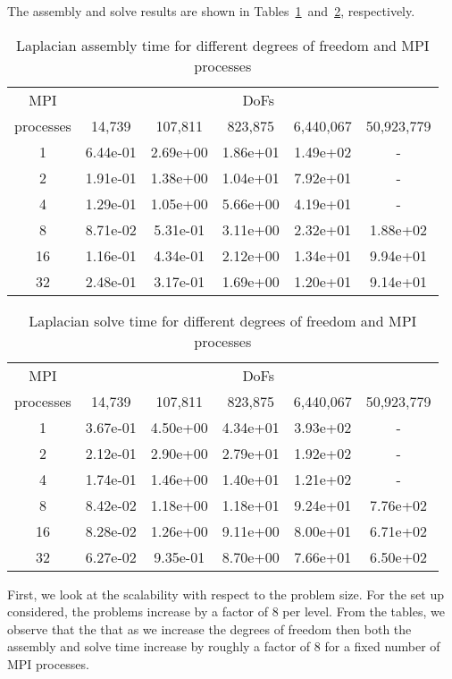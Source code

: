 \documentclass[11pt]{article}
\begin{document}
The assembly and solve results are shown in Tables~\ref{tab:Ltime}~and~\ref{tab:Lsolve}, respectively.
\begin{table}[h!]
    \centering
    \begin{tabular}{|c|ccccc|}
        \hline
        MPI & \multicolumn{5}{c|}{DoFs}\\
        processes &  14,739   &   107,811  &   823,875  &   6,440,067  & 50,923,779 \\
        \hline
            1  & 6.44e-01 &  2.69e+00 &  1.86e+01 &  1.49e+02 & - \\
            2  & 1.91e-01 &  1.38e+00 &  1.04e+01 &  7.92e+01 & - \\
            4  & 1.29e-01 &  1.05e+00 &  5.66e+00 &  4.19e+01 & - \\
            8  & 8.71e-02 &  5.31e-01 &  3.11e+00 &  2.32e+01 & 1.88e+02 \\
            16 & 1.16e-01 &  4.34e-01 &  2.12e+00 &  1.34e+01 & 9.94e+01 \\
            32 & 2.48e-01 &  3.17e-01 &  1.69e+00 &  1.20e+01 & 9.14e+01 \\
        \hline
    \end{tabular}
    \caption{Laplacian assembly time for different degrees of freedom and MPI processes}
    \label{tab:Ltime}
\end{table}
\begin{table}[h!]
    \centering
    \begin{tabular}{|c|ccccc|}
        \hline
        MPI & \multicolumn{5}{c|}{DoFs}\\
        processes &  14,739   &   107,811  &   823,875  &   6,440,067  & 50,923,779 \\
        \hline
        1  & 3.67e-01 &  4.50e+00 &  4.34e+01 &  3.93e+02 & - \\
        2  & 2.12e-01 &  2.90e+00 &  2.79e+01 &  1.92e+02 & - \\
        4  & 1.74e-01 &  1.46e+00 &  1.40e+01 &  1.21e+02 & - \\
        8  & 8.42e-02 &  1.18e+00 &  1.18e+01 &  9.24e+01 & 7.76e+02 \\
        16 & 8.28e-02 &  1.26e+00 &  9.11e+00 &  8.00e+01 & 6.71e+02 \\
        32 & 6.27e-02 &  9.35e-01 &  8.70e+00 &  7.66e+01 & 6.50e+02 \\
        \hline
    \end{tabular}
    \caption{Laplacian solve time for different degrees of freedom and MPI processes}
    \label{tab:Lsolve}
\end{table}
First, we look at the scalability with respect to the problem size. For the set up considered, the problems increase by a factor of 8 per level. From the tables, we observe that the that as we increase the degrees of freedom then both the assembly and solve time increase by roughly a factor of 8 for a fixed number of MPI processes.
\end{document}
